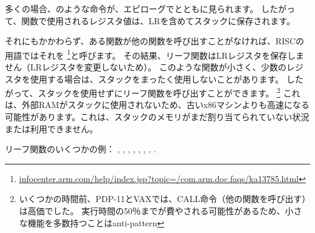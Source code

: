 多くの場合、のような命令が、エピローグでとともに見られます。
したがって、関数で使用されるレジスタ値は、\ac{LR}を含めてスタックに保存されます。

それにもかかわらず、ある関数が他の関数を呼び出すことがなければ、\ac{RISC}の用語ではそれを
\footnote{\href{http://go.yurichev.com/17064}{infocenter.arm.com/help/index.jsp?topic=/com.arm.doc.faqs/ka13785.html}}と呼びます。
その結果、リーフ関数は\ac{LR}レジスタを保存しません（\ac{LR}レジスタを変更しないため）。 
このような関数が小さく、少数のレジスタを使用する場合は、スタックをまったく使用しないことがあります。 
したがって、スタックを使用せずにリーフ関数を呼び出すことができます。
\footnote{いくつかの時間前、PDP-11とVAXでは、CALL命令（他の関数を呼び出す）は高価でした。 
実行時間の50％までが費やされる可能性があるため、小さな機能を多数持つことは\gls{anti-pattern} }
これは、外部RAMがスタックに使用されないため、古いx86マシンよりも高速になる可能性があります。これは、スタックのメモリがまだ割り当てられていない状況 または利用できません。

リーフ関数のいくつかの例：
, , 
, , ,
, , .
